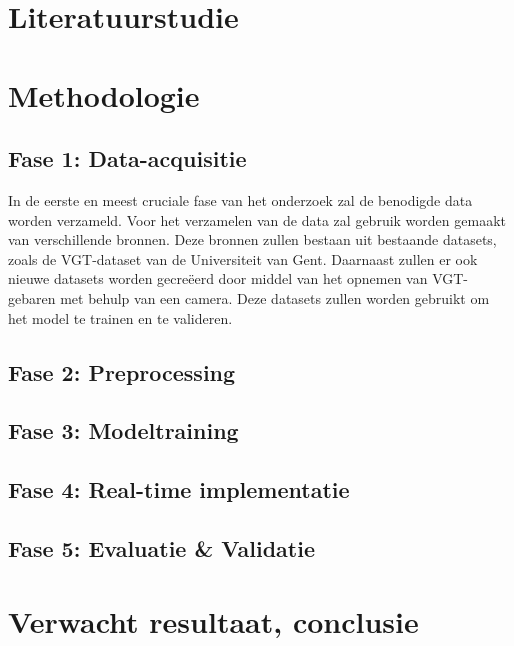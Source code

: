 \section{Literatuurstudie}%
\label{sec:literatuurstudie}


\section{Methodologie}%
\label{sec:methodologie}
\subsection{Fase 1: Data-acquisitie}
In de eerste en meest cruciale fase van het onderzoek zal de benodigde data worden verzameld.
Voor het verzamelen van de data zal gebruik worden gemaakt van verschillende bronnen.
Deze bronnen zullen bestaan uit bestaande datasets, zoals de VGT-dataset van de Universiteit van Gent.
Daarnaast zullen er ook nieuwe datasets worden gecreëerd door middel van het opnemen van VGT-gebaren met behulp van een camera.
Deze datasets zullen worden gebruikt om het model te trainen en te valideren.
\subsection{Fase 2: Preprocessing}
\subsection{Fase 3: Modeltraining}
\subsection{Fase 4: Real-time implementatie}
\subsection{Fase 5: Evaluatie \& Validatie}
\section{Verwacht resultaat, conclusie}%
\label{sec:verwachte_resultaten}

